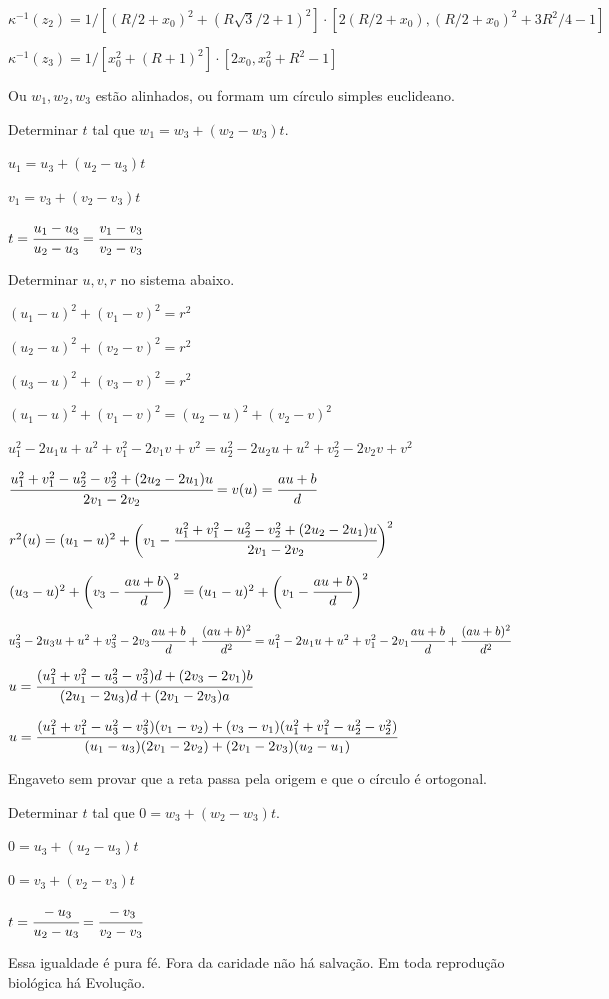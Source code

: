 \documentclass[10pt,a4paper]{article}
\begin{document}
		$\kappa^{-1}(z_2) = 1 / [(R/2 + x_0)^2 + (R\sqrt{3}/2 + 1)^2] \cdot [2(R/2 + x_0), (R/2 + x_0)^2 + 3 R^2/4 - 1]$

		$\kappa^{-1}(z_3) = 1 / [x_0^2 + (R + 1)^2] \cdot [2x_0, x_0^2 + R^2 - 1]$

		Ou $w_1, w_2, w_3$ est\~ao alinhados, ou formam um c\'irculo simples euclideano.

		Determinar $t$ tal que $w_1 = w_3 + (w_2 - w_3)t$.

		$u_1 = u_3 + (u_2 - u_3) t$

		$v_1 = v_3 + (v_2 - v_3) t$

		$t = \cfrac{u_1 - u_3}{u_2 - u_3} = \cfrac{v_1 - v_3}{v_2 - v_3}$

		\vspace{3mm}

		Determinar $u,v,r$ no sistema abaixo.

		$(u_1 - u)^2 + (v_1 - v)^2 = r^2$

		$(u_2 - u)^2 + (v_2 - v)^2 = r^2$

		$(u_3 - u)^2 + (v_3 - v)^2 = r^2$

		$(u_1 - u)^2 + (v_1 - v)^2 = (u_2 - u)^2 + (v_2 - v)^2$

		$u_1^2 - 2u_1 u + u^2 + v_1^2 - 2v_1 v + v^2 = u_2^2 - 2u_2 u + u^2 + v_2^2 - 2v_2 v + v^2$

		$\cfrac{u_1^2 + v_1^2 - u_2^2 - v_2^2 + (2u_2 - 2u_1) u}{2v_1 - 2v_2} = v(u) = \cfrac{au + b}{d}$

		$r^2(u) = (u_1 - u)^2 + \bigg(v_1 - \cfrac{u_1^2 + v_1^2 - u_2^2 - v_2^2 + (2u_2 - 2u_1) u}{2v_1 - 2v_2}\bigg)^2 $

		$(u_3 - u)^2 + \bigg(v_3 - \cfrac{au + b}{d} \bigg)^2 = (u_1 - u)^2 + \bigg(v_1 - \cfrac{au + b}{d}\bigg)^2 $

		$u_3^2 - 2 u_3 u + u^2 + v_3^2 - 2 v_3 \cfrac{au + b}{d} + \cfrac{(au+b)^2}{d^2} = u_1^2 - 2 u_1 u + u^2 + v_1^2 - 2 v_1 \cfrac{au + b}{d} + \cfrac{(au+b)^2}{d^2}$

		$u = \cfrac{(u_1^2 + v_1^2 - u_3^2 - v_3^2)d + (2 v_3 - 2 v_1) b}{(2 u_1 - 2 u_3)d + (2 v_1 - 2 v_3)a}$

		$u = \cfrac{(u_1^2 + v_1^2 - u_3^2 - v_3^2)(v_1 - v_2) + (v_3 - v_1) (u_1^2 + v_1^2 - u_2^2 - v_2^2)}{(u_1 - u_3)(2v_1 - 2v_2) + (2 v_1 - 2 v_3)(u_2 - u_1)}$

		Engaveto sem provar que a reta passa pela origem e que o c\'irculo \'e ortogonal.

		Determinar $t$ tal que $0 = w_3 + (w_2 - w_3)t$.

		$0 = u_3 + (u_2 - u_3) t$

		$0 = v_3 + (v_2 - v_3) t$

		$t = \cfrac{- u_3}{u_2 - u_3} = \cfrac{- v_3}{v_2 - v_3}$

		Essa igualdade \'e pura f\'e. Fora da caridade n\~ao h\'a salva\c{c}\~ao. Em toda reprodu\c{c}\~ao biol\'ogica h\'a Evolu\c{c}\~ao.
\end{document}
